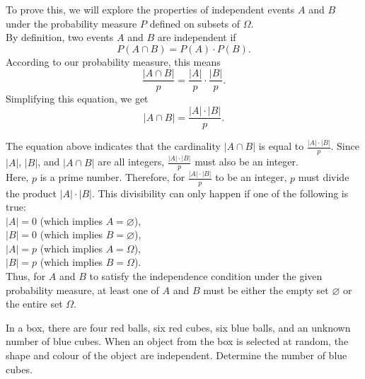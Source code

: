 \begin{solution}

    To prove this, we will explore the properties of independent events \(A\) and \(B\) under the probability measure \(P\) defined on subsets of \(\Omega\).\\

    By definition, two events \(A\) and \(B\) are independent if 
       \[
       P(A \cap B) = P(A) \cdot P(B).
       \]
       According to our probability measure, this means
       \[
       \frac{|A \cap B|}{p} = \frac{|A|}{p} \cdot \frac{|B|}{p}.
       \]
       Simplifying this equation, we get
       \[
       |A \cap B| = \frac{|A| \cdot |B|}{p}.
       \]
    
    The equation above indicates that the cardinality \(|A \cap B|\) is equal to \(\frac{|A| \cdot |B|}{p}\). Since \(|A|\), \(|B|\), and \(|A \cap B|\) are all integers, \(\frac{|A| \cdot |B|}{p}\) must also be an integer.\\
    
    Here, \(p\) is a prime number. Therefore, for \(\frac{|A| \cdot |B|}{p}\) to be an integer, \(p\) must divide the product \(|A| \cdot |B|\). This divisibility can only happen if one of the following is true:\\
    
       \(|A| = 0\) (which implies \(A = \varnothing\)),\\
       \(|B| = 0\) (which implies \(B = \varnothing\)),\\
       \(|A| = p\) (which implies \(A = \Omega\)),\\
       \(|B| = p\) (which implies \(B = \Omega\)).\\
    
     Thus, for \(A\) and \(B\) to satisfy the independence condition under the given probability measure, at least one of \(A\) and \(B\) must be either the empty set \(\varnothing\) or the entire set \(\Omega\).    
\end{solution}


\begin{exercise}
    In a box, there are four red balls, six red cubes, six blue balls, and an unknown number of blue cubes. When an object from the box is selected at random, the shape and colour of the object are independent. Determine the number of blue cubes.
\end{exercise}

